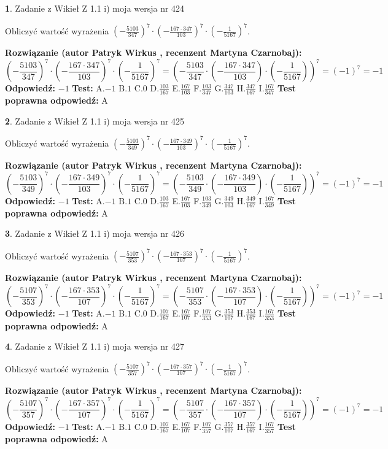 \documentclass[12pt, a4paper]{article}
\theoremstyle{definition} %
\newtheorem{zad}{}
\newcommand{\zadStart}[1]{\begin{zad}#1\newline}
\newcommand{\zadStop}{\end{zad}}
\newcommand{\rozwStart}[2]{\noindent \textbf{Rozwiązanie (autor #1 , recenzent #2): }\newline}
\newcommand{\rozwStop}{\newline}
\newcommand{\odpStart}{\noindent \textbf{Odpowiedź:}\newline}
\newcommand{\odpStop}{\newline}
\newcommand{\testStart}{\noindent \textbf{Test:}\newline}
\newcommand{\testStop}{\newline}
\newcommand{\kluczStart}{\noindent \textbf{Test poprawna odpowiedź:}\newline}
\newcommand{\kluczStop}{\newline}
\begin{document}
\zadStart{Zadanie z Wikieł Z 1.1 i) moja wersja nr 424}

Obliczyć wartość wyrażenia $(-\frac{5103}{347})^{7} \cdot (-\frac{167 \cdot 347}{103})^{7} \cdot (-\frac{1}{5167})^{7}$.
\zadStop
\rozwStart{Patryk Wirkus}{Martyna Czarnobaj}
$$(-\frac{5103}{347})^{7} \cdot (-\frac{167 \cdot 347}{103})^{7} \cdot (-\frac{1}{5167})^{7} = (-\frac{5103}{347} \cdot (-\frac{167 \cdot 347}{103}) \cdot (-\frac{1}{5167}))^{7} = (-1)^{7} = -1$$
\rozwStop
\odpStart
$-1$
\odpStop
\testStart
A.$-1$ B.$1$ C.$0$ D.$\frac{103}{167}$ E.$\frac{167}{103}$
F.$\frac{103}{347}$ G.$\frac{347}{103}$
H.$\frac{347}{167}$
I.$\frac{167}{347}$
\testStop
\kluczStart
A
\kluczStop



\zadStart{Zadanie z Wikieł Z 1.1 i) moja wersja nr 425}

Obliczyć wartość wyrażenia $(-\frac{5103}{349})^{7} \cdot (-\frac{167 \cdot 349}{103})^{7} \cdot (-\frac{1}{5167})^{7}$.
\zadStop
\rozwStart{Patryk Wirkus}{Martyna Czarnobaj}
$$(-\frac{5103}{349})^{7} \cdot (-\frac{167 \cdot 349}{103})^{7} \cdot (-\frac{1}{5167})^{7} = (-\frac{5103}{349} \cdot (-\frac{167 \cdot 349}{103}) \cdot (-\frac{1}{5167}))^{7} = (-1)^{7} = -1$$
\rozwStop
\odpStart
$-1$
\odpStop
\testStart
A.$-1$ B.$1$ C.$0$ D.$\frac{103}{167}$ E.$\frac{167}{103}$
F.$\frac{103}{349}$ G.$\frac{349}{103}$
H.$\frac{349}{167}$
I.$\frac{167}{349}$
\testStop
\kluczStart
A
\kluczStop



\zadStart{Zadanie z Wikieł Z 1.1 i) moja wersja nr 426}

Obliczyć wartość wyrażenia $(-\frac{5107}{353})^{7} \cdot (-\frac{167 \cdot 353}{107})^{7} \cdot (-\frac{1}{5167})^{7}$.
\zadStop
\rozwStart{Patryk Wirkus}{Martyna Czarnobaj}
$$(-\frac{5107}{353})^{7} \cdot (-\frac{167 \cdot 353}{107})^{7} \cdot (-\frac{1}{5167})^{7} = (-\frac{5107}{353} \cdot (-\frac{167 \cdot 353}{107}) \cdot (-\frac{1}{5167}))^{7} = (-1)^{7} = -1$$
\rozwStop
\odpStart
$-1$
\odpStop
\testStart
A.$-1$ B.$1$ C.$0$ D.$\frac{107}{167}$ E.$\frac{167}{107}$
F.$\frac{107}{353}$ G.$\frac{353}{107}$
H.$\frac{353}{167}$
I.$\frac{167}{353}$
\testStop
\kluczStart
A
\kluczStop



\zadStart{Zadanie z Wikieł Z 1.1 i) moja wersja nr 427}

Obliczyć wartość wyrażenia $(-\frac{5107}{357})^{7} \cdot (-\frac{167 \cdot 357}{107})^{7} \cdot (-\frac{1}{5167})^{7}$.
\zadStop
\rozwStart{Patryk Wirkus}{Martyna Czarnobaj}
$$(-\frac{5107}{357})^{7} \cdot (-\frac{167 \cdot 357}{107})^{7} \cdot (-\frac{1}{5167})^{7} = (-\frac{5107}{357} \cdot (-\frac{167 \cdot 357}{107}) \cdot (-\frac{1}{5167}))^{7} = (-1)^{7} = -1$$
\rozwStop
\odpStart
$-1$
\odpStop
\testStart
A.$-1$ B.$1$ C.$0$ D.$\frac{107}{167}$ E.$\frac{167}{107}$
F.$\frac{107}{357}$ G.$\frac{357}{107}$
H.$\frac{357}{167}$
I.$\frac{167}{357}$
\testStop
\kluczStart
A
\kluczStop
\end{document}
